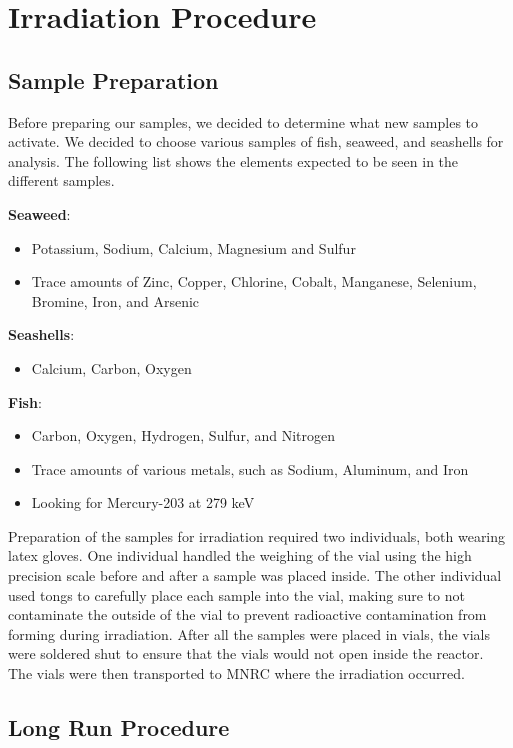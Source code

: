 \documentclass[]{article}
\begin{document}
\pagebreak
 

\section{Irradiation Procedure}

\subsection{Sample Preparation}
Before preparing our samples, we decided to determine what new samples to activate. We decided to choose various samples of fish, seaweed, and seashells for analysis. The following list shows the elements expected to be seen in the different samples.

\textbf{Seaweed}:
\begin{itemize}
\item Potassium, Sodium, Calcium, Magnesium and Sulfur
\item Trace amounts of Zinc, Copper, Chlorine, Cobalt, Manganese, Selenium, Bromine, Iron, and Arsenic
\end{itemize}

\textbf{Seashells}:
\begin{itemize}
\item Calcium, Carbon, Oxygen
\end{itemize}

\textbf{Fish}:
\begin{itemize}
\item Carbon, Oxygen, Hydrogen, Sulfur, and Nitrogen
\item Trace amounts of various metals, such as Sodium, Aluminum, and Iron
\item Looking for Mercury-203 at 279 keV
\end{itemize}


Preparation of the samples for irradiation required two individuals, both wearing latex gloves. One individual handled the weighing of the vial using the high precision scale before and after a sample was placed inside. The other individual used tongs to carefully place each sample into the vial, making sure to not contaminate the outside of the vial to prevent radioactive contamination from forming during irradiation. After all the samples were placed in vials, the vials were soldered shut to ensure that the vials would not open inside the reactor. The vials were then transported to MNRC where the irradiation occurred. 

\subsection{Long Run Procedure}
\end{document}
